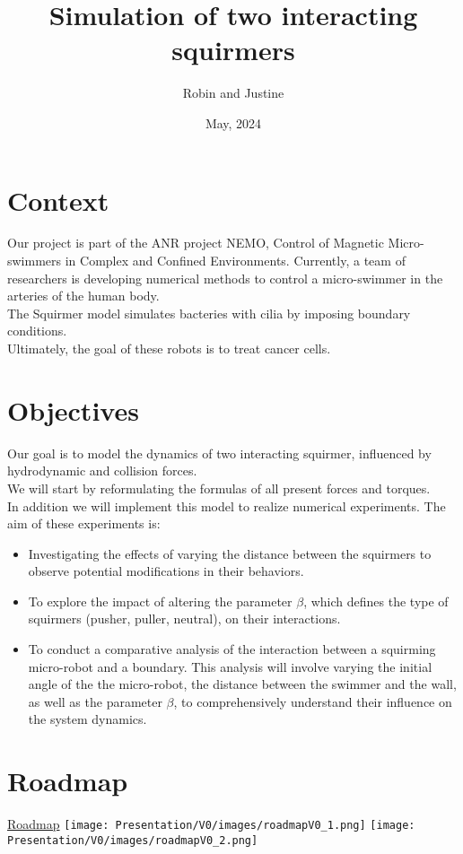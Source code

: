 \documentclass[options]{article}
\begin{document}
\title{Simulation of two interacting squirmers}
\author{Robin and Justine}
\date{May, 2024}
\maketitle

\section{Context}
Our project is part of the ANR project NEMO, Control of Magnetic Micro-swimmers in Complex and Confined Environments.
Currently, a team of researchers is developing numerical methods to control a micro-swimmer in the arteries
of the human body.\\
The Squirmer model simulates bacteries with cilia by imposing boundary conditions.\\
Ultimately, the goal of these robots is to treat cancer cells.\\

\vspace{0.5cm}
\section{Objectives}
Our goal is to model the dynamics of two interacting squirmer, influenced by hydrodynamic \cite{Brumley} and collision forces.\\
We will start by reformulating the formulas of all present forces and torques.\cite{Brumley}\cite{Lauga}\\
In addition we will implement this model to realize numerical experiments. The aim of these experiments is: 
\begin{itemize}
    \item Investigating the effects of varying the distance between the squirmers to observe
    potential modifications in their behaviors.
    \item To explore the impact of altering the parameter $\beta$, which defines the
    type of squirmers (pusher, puller, neutral), on their interactions.
    \item To conduct a comparative analysis of the interaction between a squirming micro-robot and a 
    boundary. This analysis will involve varying the initial angle of the the micro-robot, the distance between the swimmer and the wall, as well as the parameter $\beta$, 
    to comprehensively understand their influence on the system dynamics.
\end{itemize}

\newpage
\section{Roadmap}
\begin{center}
    \href{https://github.com/orgs/master-csmi/projects/23/views/2}{Roadmap}
    \texttt{[image: Presentation/V0/images/roadmapV0\_1.png]}
    \vspace{1em} %
    \texttt{[image: Presentation/V0/images/roadmapV0\_2.png]}
\end{center}


\nocite{*}


\end{document}
